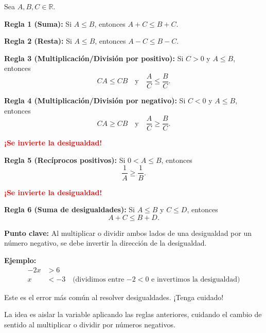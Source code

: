
\begin{theorem}
Sea $A, B, C \in \mathbb{R}$.

\textbf{Regla 1 (Suma):} Si $A \le B$, entonces $A + C \le B + C$.

\textbf{Regla 2 (Resta):} Si $A \le B$, entonces $A - C \le B - C$.

\textbf{Regla 3 (Multiplicación/División por positivo):} Si $C > 0$ y $A \le B$, entonces
\[CA \le CB \quad \text{y} \quad \dfrac{A}{C} \le \dfrac{B}{C}.\]

\textbf{Regla 4 (Multiplicación/División por negativo):} Si $C < 0$ y $A \le B$, entonces
\[CA \ge CB \quad \text{y} \quad \dfrac{A}{C} \ge \dfrac{B}{C}.\]

\footnotesize
\begin{center}
\textcolor{red}{\textbf{¡Se invierte la desigualdad!}}
\end{center}
\normalsize

\textbf{Regla 5 (Recíprocos positivos):} Si $0 < A \le B$, entonces
\[\dfrac{1}{A} \ge \dfrac{1}{B}.\]

\footnotesize
\begin{center}
	\textcolor{red}{\textbf{¡Se invierte la desigualdad!}}
\end{center}
\normalsize


\textbf{Regla 6 (Suma de desigualdades):} Si $A \le B$ y $C \le D$, entonces
\[A + C \le B + D.\]
\end{theorem}

\begin{warning}
\textbf{Punto clave:} Al multiplicar o dividir ambos lados de una desigualdad por un número negativo, se debe invertir la dirección de la desigualdad.

\textbf{Ejemplo:}
\begin{align*}
-2x &> 6 \\
x &< -3 \quad \text{(dividimos entre $-2 < 0$ e invertimos la desigualdad)}
\end{align*}

Este es el error más común al resolver desigualdades. ¡Tenga cuidado!
\end{warning}

\newpage


La idea es aislar la variable aplicando las reglas anteriores, cuidando el cambio de sentido al multiplicar o dividir por números negativos.

